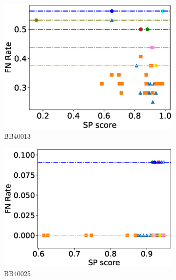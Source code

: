 \begin{figure}[!htbp]
\begin{adjustwidth}{-1cm}{-1cm}
\begin{subfigure}{0.22\textwidth}
			\includegraphics[width=\columnwidth]{Figure/summary/precomputedInit/Balibase/BB40013_fnrate_vs_sp_2}
			\caption{BB40013}
		\end{subfigure}
		\begin{subfigure}{0.22\textwidth}
			\includegraphics[width=\columnwidth]{Figure/summary/precomputedInit/Balibase/BB40025_fnrate_vs_sp_2}
			\caption{BB40025}
		\end{subfigure}
		\begin{subfigure}{0.22\textwidth}

\end{subfigure}
\end{adjustwidth}
\end{figure}
